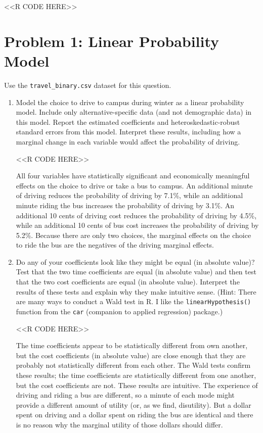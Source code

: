 \documentclass[11pt,letterpaper]{article}
\begin{document}
<<R CODE HERE>>

\section*{Problem 1: Linear Probability Model}

Use the \texttt{travel\_binary.csv} dataset for this question.

\begin{enumerate}[label=\alph*., leftmargin=*]
	\item Model the choice to drive to campus during winter as a linear probability model. Include only alternative-specific data (and not demographic data) in this model. Report the estimated coefficients and heteroskedastic-robust standard errors from this model. Interpret these results, including how a marginal change in each variable would affect the probability of driving.

	<<R CODE HERE>>

	All four variables have statistically significant and economically meaningful effects on the choice to drive or take a bus to campus. An additional minute of driving reduces the probability of driving by 7.1\%, while an additional minute riding the bus increases the probability of driving by 3.1\%. An additional 10 cents of driving cost reduces the probability of driving by 4.5\%, while an additional 10 cents of bus cost increases the probability of driving by 5.2\%. Because there are only two choices, the marginal effects on the choice to ride the bus are the negatives of the driving marginal effects.
	
	\item Do any of your coefficients look like they might be equal (in absolute value)? Test that the two time coefficients are equal (in absolute value) and then test that the two cost coefficients are equal (in absolute value). Interpret the results of these tests and explain why they make intuitive sense. (Hint: There are many ways to conduct a Wald test in R. I like the \texttt{linearHypothesis()} function from the \texttt{car} (companion to applied regression) package.) 

	<<R CODE HERE>>

	The time coefficients appear to be statistically different from own another, but the cost coefficients (in absolute value) are close enough that they are probably not statistically different from each other. The Wald tests confirm these results; the time coefficients are statistically different from one another, but the cost coefficients are not. These results are intuitive. The experience of driving and riding a bus are different, so a minute of each mode might provide a different amount of utility (or, as we find, disutility). But a dollar spent on driving and a dollar spent on riding the bus are identical and there is no reason why the marginal utility of those dollars should differ.
	

\end{enumerate}
\end{document}
